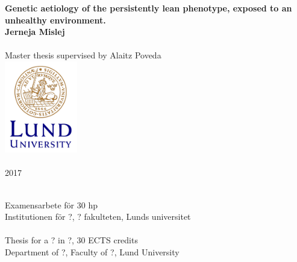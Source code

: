 \documentclass[a4paper,12pt]{article}
\begin{document}
\begin{titlepage}
\vfill
\begin{center}
{\large\bf Genetic aetiology of the persistently lean phenotype, exposed to an unhealthy environment.}
\\[3cm]
{\bf Jerneja Mislej}
\\[5mm]
\\[2cm]
{Master thesis supervised by Alaitz Poveda}
\\[2cm]
\includegraphics[height=4cm]{Lund_University_logotype.png}
{\\\\2017}
\\[5cm]
\end{center}
{\\Examensarbete för 30 hp\\
Institutionen för ?, ? fakulteten, Lunds universitet
\\
\\Thesis for a ? in ?, 30 ECTS credits
\\Department of ?, Faculty of ?, Lund University}

\end{titlepage}
\thispagestyle{empty} %

\end{document}

